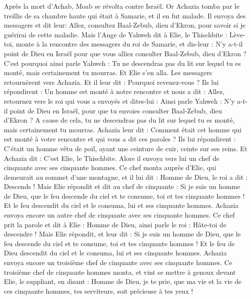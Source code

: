 \begin{multicols}{2}
\VerseOne{}Après la mort d'Achab, Moab se révolta contre Israël.
Or Achazia tomba par le treillis de sa chambre haute qui était à Samarie, et il en fut malade. Il envoya des messagers et dit leur: Allez, consultez Baal-Zebub, dieu d'Ekron, pour savoir si je guérirai de cette maladie.
Mais l'Ange de Yahweh dit à Elie, le Thischbite : Lève-toi, monte à la rencontre des messagers du roi de Samarie, et dis-leur : N'y a-t-il point de Dieu en Israël pour que vous alliez consulter Baal-Zebub, dieu d'Ekron ?
C'est pourquoi ainsi parle Yahweh : Tu ne descendras pas du lit sur lequel tu es monté, mais certainement tu mourras. Et Elie s'en alla.
Les messagers retournèrent vers Achazia. Et il leur dit : Pourquoi revenez-vous ?
Ils lui répondirent : Un homme est monté à notre rencontre et nous a dit : Allez, retournez vers le roi qui vous a envoyés et dites-lui : Ainsi parle Yahweh : N'y a-t-il point de Dieu en Israël, pour que tu envoies consulter Baal-Zebub, dieu d'Ekron ? A cause de cela, tu ne descendras pas du lit sur lequel tu es monté, mais certainement tu mourras.
Achazia leur dit : Comment était cet homme qui est monté à votre rencontre et qui vous a dit ces paroles ?
Ils lui répondirent : C'était un homme vêtu de poil, ayant une ceinture de cuir, ceinte sur ses reins. Et Achazia dit : C'est Elie, le Thischbite.
Alors il envoya vers lui un chef de cinquante avec ses cinquante hommes. Ce chef monta auprès d'Elie, qui demeurait au sommet d'une montagne, et il lui dit : Homme de Dieu, le roi a dit : Descends !
Mais Elie répondit et dit au chef de cinquante : Si je suis un homme de Dieu, que le feu descende du ciel et te consume, toi et tes cinquante hommes ! Et le feu descendit du ciel et le consuma, lui et ses cinquante hommes.
Achazia envoya encore un autre chef de cinquante avec ses cinquante hommes. Ce chef prit la parole et dit à Elie : Homme de Dieu, ainsi parle le roi : Hâte-toi de descendre !
Mais Elie répondit, et leur dit : Si je suis un homme de Dieu, que le feu descende du ciel et te consume, toi et tes cinquante hommes ! Et le feu de Dieu descendit du ciel et le consuma, lui et ses cinquante hommes.
Achazia envoya encore un troisième chef de cinquante avec ses cinquante hommes. Ce troisième chef de cinquante hommes monta, et vint se mettre à genoux devant Elie, le suppliant, en disant : Homme de Dieu, je te prie, que ma vie et la vie de ces cinquante hommes, tes serviteurs, soit précieuse à tes yeux !

\end{multicols}
